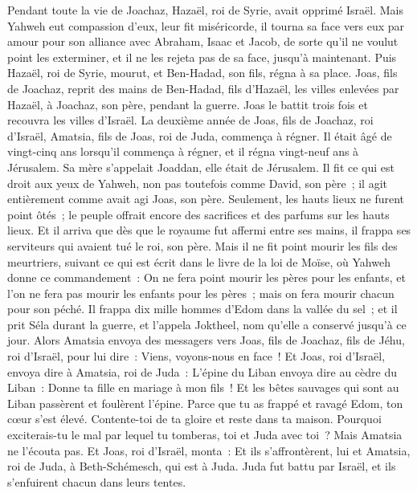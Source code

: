 \begin{multicols}{2}
Pendant toute la vie de Joachaz, Hazaël, roi de Syrie, avait opprimé Israël.
Mais Yahweh eut compassion d'eux, leur fit miséricorde, il tourna sa face vers eux par amour pour son alliance avec Abraham, Isaac et Jacob, de sorte qu'il ne voulut point les exterminer, et il ne les rejeta pas de sa face, jusqu'à maintenant.
Puis Hazaël, roi de Syrie, mourut, et Ben-Hadad, son fils, régna à sa place.
Joas, fils de Joachaz, reprit des mains de Ben-Hadad, fils d'Hazaël, les villes enlevées par Hazaël, à Joachaz, son père, pendant la guerre. Joas le battit trois fois et recouvra les villes d'Israël.
\VerseOne{}La deuxième année de Joas, fils de Joachaz, roi d'Israël, Amatsia, fils de Joas, roi de Juda, commença à régner.
Il était âgé de vingt-cinq ans lorsqu'il commença à régner, et il régna vingt-neuf ans à Jérusalem. Sa mère s'appelait Joaddan, elle était de Jérusalem.
Il fit ce qui est droit aux yeux de Yahweh, non pas toutefois comme David, son père~; il agit entièrement comme avait agi Joas, son père.
Seulement, les hauts lieux ne furent point ôtés~; le peuple offrait encore des sacrifices et des parfums sur les hauts lieux.
Et il arriva que dès que le royaume fut affermi entre ses mains, il frappa ses serviteurs qui avaient tué le roi, son père.
Mais il ne fit point mourir les fils des meurtriers, suivant ce qui est écrit dans le livre de la loi de Moïse, où Yahweh donne ce commandement~: On ne fera point mourir les pères pour les enfants, et l'on ne fera pas mourir les enfants pour les pères~; mais on fera mourir chacun pour son péché.
Il frappa dix mille hommes d'Edom dans la vallée du sel~; et il prit Séla durant la guerre, et l'appela Joktheel, nom qu'elle a conservé jusqu'à ce jour.
Alors Amatsia envoya des messagers vers Joas, fils de Joachaz, fils de Jéhu, roi d'Israël, pour lui dire~: Viens, voyons-nous en face~!
Et Joas, roi d'Israël, envoya dire à Amatsia, roi de Juda~: L'épine du Liban envoya dire au cèdre du Liban~: Donne ta fille en mariage à mon fils~! Et les bêtes sauvages qui sont au Liban passèrent et foulèrent l'épine.
Parce que tu as frappé et ravagé Edom, ton cœur s'est élevé. Contente-toi de ta gloire et reste dans ta maison. Pourquoi exciterais-tu le mal par lequel tu tomberas, toi et Juda avec toi~?
Mais Amatsia ne l'écouta pas. Et Joas, roi d'Israël, monta~: Et ils s'affrontèrent, lui et Amatsia, roi de Juda, à Beth-Schémesch, qui est à Juda.
Juda fut battu par Israël, et ils s'enfuirent chacun dans leurs tentes.

\end{multicols}

